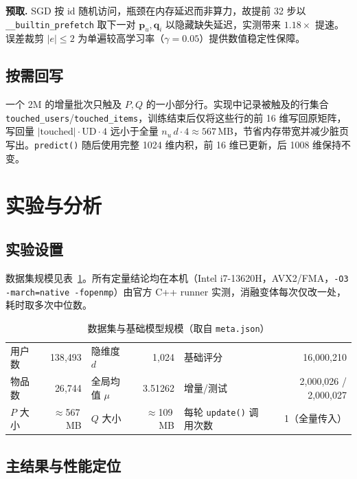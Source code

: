 \documentclass[UTF8,a4paper,10pt]{ctexart}
\newcommand{\xiaosi}{\fontsize{12pt}{20pt}\selectfont}
\newcommand{\nPrefetchSpeed}{1.18}
\begin{document}
\textbf{预取.} SGD 按 id 随机访问，瓶颈在内存延迟而非算力，故提前 32 步以 \texttt{\_\_builtin\_prefetch} 取下一对 $\mathbf p_u,\mathbf q_i$ 以隐藏缺失延迟，实测带来 $\nPrefetchSpeed\times$ 提速。误差裁剪 $|e|\le2$ 为单遍较高学习率（$\gamma{=}0.05$）提供数值稳定性保障。


\subsection{按需回写}\label{sub:writeback}

一个 2M 的增量批次只触及 $P,Q$ 的一小部分行。实现中记录被触及的行集合 \texttt{touched\_users}/\texttt{touched\_items}，训练结束后仅将这些行的前 16 维写回原矩阵，写回量 $|\text{touched}|\cdot\text{UD}\cdot4$ 远小于全量 $n_u\,d\cdot4\approx567$\,MB，节省内存带宽并减少脏页写出。\texttt{predict()} 随后使用完整 1024 维内积，前 16 维已更新，后 1008 维保持不变。

\section{实验与分析}
\xiaosi

\subsection{实验设置}

数据集规模见表~\ref{tab:data}。所有定量结论均在本机（Intel i7-13620H，AVX2/FMA，\texttt{-O3 -march=native -fopenmp}）由官方 C++ runner 实测，消融变体每次仅改一处，耗时取多次中位数。

\begin{table}[H]
  \centering
  \caption{数据集与基础模型规模（取自 \texttt{meta.json}）}
  \label{tab:data}
  \renewcommand{\arraystretch}{1.06}
  \small
  \begin{tabular}{l r l r l r}
    \toprule
    用户数 & 138{,}493 & 隐维度 $d$ & 1{,}024 & 基础评分 & 16{,}000{,}210 \\
    物品数 & 26{,}744  & 全局均值 $\mu$ & 3.51262 & 增量/测试 & 2{,}000{,}026 / 2{,}000{,}027 \\
    $P$ 大小 & $\approx$567\,MB & $Q$ 大小 & $\approx$109\,MB & 每轮 \texttt{update()} 调用次数 & 1（全量传入）\\
    \bottomrule
  \end{tabular}
\end{table}

\subsection{主结果与性能定位}\label{sub:exp-main}
\end{document}
